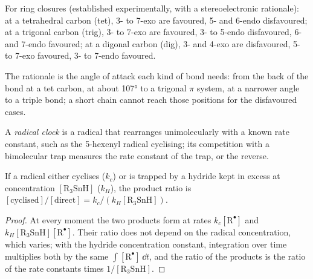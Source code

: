 \begin{proposition}\label{prop:b3:radicals-carbenes:baldwin}
For ring closures (established experimentally, with a stereoelectronic
rationale): at a tetrahedral carbon (tet), 3- to 7-exo are favoured, 5- and
6-endo disfavoured; at a trigonal carbon (trig), 3- to 7-exo are favoured, 3- to 5-endo
disfavoured, 6- and 7-endo favoured; at a digonal carbon (dig), 3- and 4-exo are
disfavoured, 5- to 7-exo favoured, 3- to 7-endo favoured.
\end{proposition}

The rationale is the angle of attack each kind of bond needs: from the back of
the bond at a tet carbon, at about 107° to a trigonal $\pi$ system, at a narrower
angle to a triple bond; a short chain cannot reach those positions for the
disfavoured cases.

\begin{definition}\label{def:b3:radicals-carbenes:radical-clock}
A \emph{radical clock} is a radical that rearranges
unimolecularly with a known rate constant, such as the 5-hexenyl radical
cyclising; its competition with a bimolecular trap measures the rate constant
of the trap, or the reverse.
\end{definition}

\begin{proposition}\label{prop:b3:radicals-carbenes:clock}
If a radical either cyclises ($k_c$) or is trapped by a hydride kept in excess at
concentration $[\mathrm{R_3SnH}]$ ($k_H$), the product ratio is
$[\text{cyclised}]/[\text{direct}] = k_c/(k_H[\mathrm{R_3SnH}])$.
\end{proposition}

\begin{proof}
At every moment the two products form at rates $k_c[\mathrm R^\bullet]$ and $k_H[\mathrm{R_3SnH}][\mathrm R^\bullet]$. Their ratio
does not depend on the radical concentration, which varies; with the hydride
concentration constant, integration over time multiplies both by the same
$\int[\mathrm R^\bullet]\,\dd t$, and the ratio of the products is the ratio of the rate constants
times $1/[\mathrm{R_3SnH}]$.
\end{proof}

